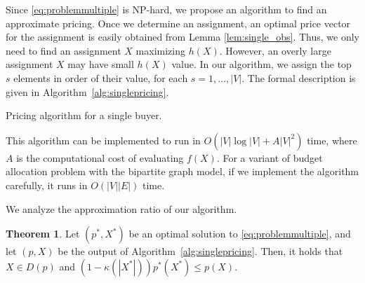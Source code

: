 \documentclass[letterpaper]{article}
\theoremstyle{definition}
\newtheorem{theorem}{Theorem}
\newcommand{\COMM}[2]{{
\begin{CJK}{UTF8}{ipxm}
\ifthenelse{\equal{#1}{TM}}{\color{blue}}{
\ifthenelse{\equal{#1}{YK}}{\color{red}}{
\ifthenelse{\equal{#1}{HS}}{\color{cyan}}{
\ifthenelse{\equal{#1}{KK}}{\color{magenta}}}}}
[#1: #2]
\end{CJK}
}}
\begin{document}
Since \eqref{eq:problemmultiple} is NP-hard, we propose an algorithm to find an approximate pricing. 
Once we determine an assignment, an optimal price vector for the assignment is easily obtained from Lemma \ref{lem:single_obs}. 
Thus, we only need to find an assignment $X$ maximizing $h(X)$. 
However, an overly large assignment $X$ may have small $h(X)$ value. 
In our algorithm, we assign the top $s$ elements in order of their value, for each $s =1, \ldots, |V|$. 
The formal description is given in Algorithm~\ref{alg:singlepricing}.  
\begin{algorithm}[tb]
\caption{Pricing algorithm for a single buyer.}
\label{alg:singlepricing}
\begin{algorithmic}
\end{algorithmic}
\end{algorithm}

This algorithm can be implemented to run in $O(|V| \log |V| + A |V|^2)$ time,
where $A$ is the computational cost of evaluating $f(X)$.
For a variant of budget allocation problem with the bipartite graph model, 
if we implement the algorithm carefully, it runs in $O(|V| |E|)$ time.

We analyze the approximation ratio of our algorithm.
\begin{theorem}
\label{thm:singlepricing}
Let $(p^*, X^*)$ be an optimal solution to \eqref{eq:problemmultiple}, and let $(p, X)$ be the output of Algorithm~\ref{alg:singlepricing}.
Then, it holds that $X \in D(p)$ and \((1 - \kappa(|X^*|)) p^*(X^*) \le p(X)\).
\end{theorem}
\end{document}

